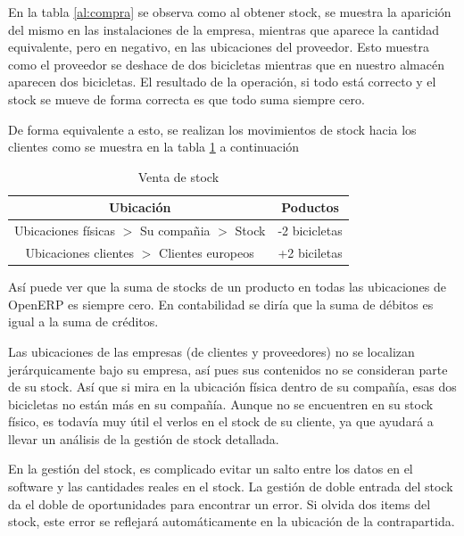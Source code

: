 En la tabla \ref{al:compra} se observa como al obtener stock, se muestra la aparición del mismo en las instalaciones de la empresa, mientras que aparece la cantidad equivalente, pero en negativo, en las ubicaciones del proveedor. Esto muestra como el proveedor se deshace de dos bicicletas mientras que en nuestro almacén aparecen dos bicicletas. El resultado de la operación, si todo está correcto y el stock se mueve de forma correcta es que todo suma siempre cero. 

De forma equivalente a esto, se realizan los movimientos de stock hacia los clientes como se muestra en la tabla \ref{al:venta} a continuación

\begin{table}[!th]
  \begin{center}
  \begin{tabular}{|c|c|}
    \hline
    Ubicación & Poductos \\
    \hline
    Ubicaciones físicas $>$ Su compañia $>$ Stock & -2 bicicletas \\
    \hline
    Ubicaciones clientes $>$ Clientes europeos & +2 biciletas \\
    \hline
  \end{tabular}
  \end{center}
  \caption{Venta de stock}
  \label{al:venta}

\end{table}

Así puede ver que la suma de stocks de un producto en todas las ubicaciones de OpenERP es siempre cero. En contabilidad se diría que la suma de débitos es igual a la suma de créditos.

Las ubicaciones de las empresas (de clientes y proveedores) no se localizan jerárquicamente bajo su empresa, así pues sus contenidos no se consideran parte de su stock. Así que si mira en la ubicación física dentro de su compañía, esas dos bicicletas no están más en su compañía. Aunque no se encuentren en su stock físico, es todavía muy útil el verlos en el stock de su cliente, ya que ayudará a llevar un análisis de la gestión de stock detallada.

En la gestión del stock, es complicado evitar un salto entre los datos en el software y las cantidades reales en el stock. La gestión de doble entrada del stock da el doble de oportunidades para encontrar un error. Si olvida dos items del stock, este error se reflejará automáticamente en la ubicación de la contrapartida.


